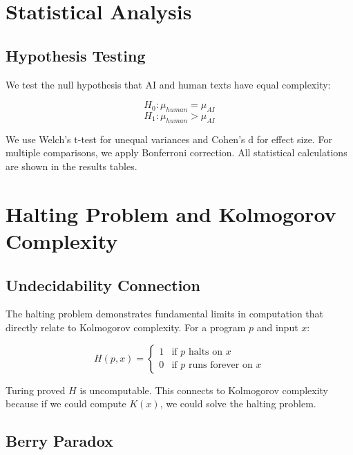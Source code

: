 \documentclass[12pt,a4paper]{report}
\begin{document}
\section{Statistical Analysis}

\subsection{Hypothesis Testing}

We test the null hypothesis that AI and human texts have equal complexity:

\begin{equation}
H_0: \mu_{human} = \mu_{AI}
\end{equation}
\begin{equation}
H_1: \mu_{human} > \mu_{AI}
\end{equation}

We use Welch's t-test for unequal variances and Cohen's d for effect size. For multiple comparisons, we apply Bonferroni correction. All statistical calculations are shown in the results tables.

\section{Halting Problem and Kolmogorov Complexity}

\subsection{Undecidability Connection}

The halting problem demonstrates fundamental limits in computation that directly relate to Kolmogorov complexity. For a program $p$ and input $x$:

\begin{equation}
H(p,x) = \begin{cases}
1 & \text{if } p \text{ halts on } x \\
0 & \text{if } p \text{ runs forever on } x
\end{cases}
\end{equation}

Turing proved $H$ is uncomputable. This connects to Kolmogorov complexity because if we could compute $K(x)$, we could solve the halting problem.

\subsection{Berry Paradox}
\end{document}
